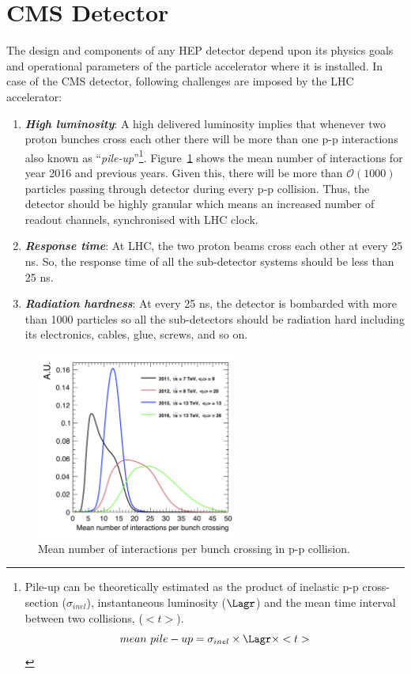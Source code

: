 \section{CMS Detector} %
\label{sec:cms_experiment}
The design and components of any HEP detector depend upon its physics goals and operational parameters of the particle accelerator where it is installed. In case of the CMS detector, following challenges are imposed by the LHC accelerator:
\begin{enumerate}
	\item \textbf{ \textit{High luminosity}}: A high delivered luminosity implies that whenever two proton bunches cross each other there will be more than one p-p interactions also known as ``\textit{pile-up}''\footnote{Pile-up can be theoretically estimated as the product of inelastic p-p cross-section ($\sigma_{inel}$), instantaneous luminosity ($\Lagr$) and the mean time interval between two collisions, ($< t >$). \begin{equation}
		mean~pile-up = \sigma_{inel} \times \Lagr \times <t>
	\end{equation}}. Figure~\ref{fig:pile-up} shows the mean number of interactions for year 2016 and previous years. Given this, there will be more than $\mathcal{O}(1000)$ particles passing through detector during every p-p collision. Thus, the detector should be highly granular which means an increased number of readout channels, synchronised with LHC clock.
	\item \textbf{\textit{Response time}}: At LHC, the two proton beams cross each other at every 25 ns. So, the response time of all the sub-detector systems should be less than 25 ns.
	\item \textbf{\textit{Radiation hardness}}: At every 25 ns, the detector is bombarded with more than 1000 particles so all the sub-detectors should be radiation hard including its electronics, cables, glue, screws, and so on.
\end{enumerate}
\begin{figure}[!htbp]
	\centering
	\includegraphics[width=0.60\textwidth]{figures/LHC/pileup.jpg}
	\caption{Mean number of interactions per bunch crossing in p-p collision.}
	\label{fig:pile-up}
\end{figure}
